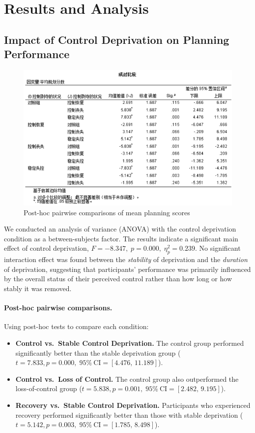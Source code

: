 \documentclass[a4paper,12pt,oneside,article]{memoir}
\begin{document}
\section*{Results and Analysis}

\subsection*{Impact of Control Deprivation on Planning Performance}

\begin{figure}[h]
    \centering
    \includegraphics[width=0.8\linewidth]{image5.png}
    \caption{Post-hoc pairwise comparisons of mean planning scores}
    \label{fig:table_of_hoc}
\end{figure}
We conducted an analysis of variance (ANOVA) with the control deprivation condition as a between-subjects factor. The results indicate a significant main effect of control deprivation, 
\(F = -8.347,\; p = 0.000,\; \eta_p^2 = 0.239.\)
No significant interaction effect was found between the \emph{stability} of deprivation and the \emph{duration} of deprivation, suggesting that participants’ performance was primarily influenced by the overall status of their perceived control rather than how long or how stably it was removed.

\paragraph{Post-hoc pairwise comparisons.}
Using post-hoc tests to compare each condition:
\begin{itemize}
    \item \textbf{Control vs.\ Stable Control Deprivation.} The control group performed significantly better than the stable deprivation group (\(t=7.833, p=0.000,\; 95\%\ \mathrm{CI}=[4.476,\,11.189]\)).
    \item \textbf{Control vs.\ Loss of Control.} The control group also outperformed the loss-of-control group (\(t=5.838, p=0.001,\; 95\%\ \mathrm{CI}=[2.482,\,9.195]\)).
    \item \textbf{Recovery vs.\ Stable Control Deprivation.} Participants who experienced recovery performed significantly better than those with stable deprivation (\(t=5.142, p=0.003,\; 95\%\ \mathrm{CI}=[1.785,\,8.498]\)).
\end{itemize}
\end{document}
